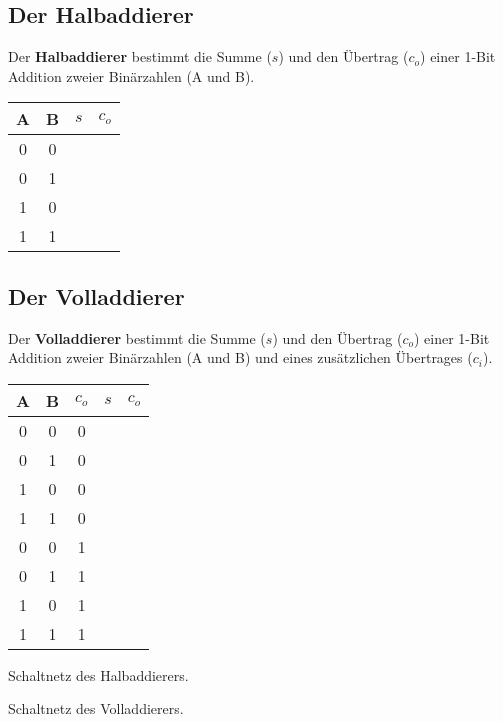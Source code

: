 \documentclass[10pt, a4paper]{arbeitsblatt}
\begin{document}
\ReiheTitel

\begin{multicols}{2}
\subsection*{Der Halbaddierer}

Der \textbf{Halbaddierer} bestimmt die Summe ($s$) und den Übertrag ($c_o$) einer 1-Bit Addition zweier Binärzahlen (A und B).

\begin{center}
\begin{tabular}{c|c|c|c}\texttt\small
	A & B & $s$ & $c_o$\\\hline
	0 & 0 & & \\
	0 & 1 & & \\
	1 & 0 & & \\
	1 & 1 & & \\
\end{tabular}
\end{center}

\vspace*{2cm}

\columnbreak

\subsection*{Der Volladdierer}

Der \textbf{Volladdierer} bestimmt die Summe ($s$) und den Übertrag ($c_o$) einer 1-Bit Addition zweier Binärzahlen (A und B) und eines zusätzlichen Übertrages ($c_i$).

\begin{center}
\begin{tabular}{c|c|c|c|c}\texttt\small
	A & B & $c_o$ & $s$ & $c_o$\\\hline
	0 & 0 & 0 & & \\
	0 & 1 & 0 & & \\
	1 & 0 & 0 & & \\
	1 & 1 & 0 & & \\
	0 & 0 & 1 & & \\
	0 & 1 & 1 & & \\
	1 & 0 & 1 & & \\
	1 & 1 & 1 & & \\
\end{tabular}
\end{center}
\end{multicols}

\begin{rahmen}\centering
Schaltnetz des Halbaddierers.
\vspace{4.5cm}
\end{rahmen}
\begin{rahmen}\centering
Schaltnetz des Volladdierers.
\vspace{4.5cm}
\end{rahmen}
\end{document}
